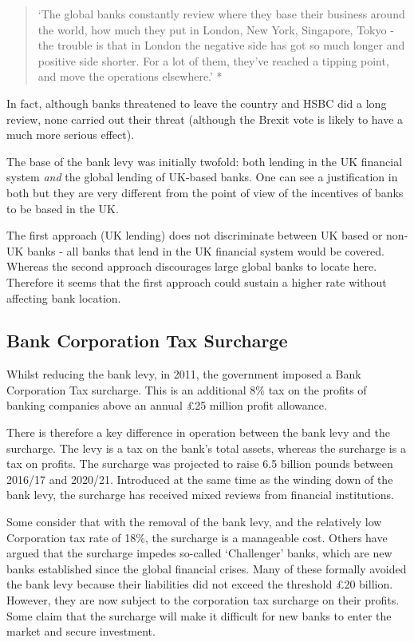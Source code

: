 \documentclass[]{tufte-handout}
\begin{document}
\begin{quote}
`The global banks constantly review where they base their business
around the world, how much they put in London, New York, Singapore,
Tokyo - the trouble is that in London the negative side has got so much
longer and positive side shorter. For a lot of them, they've reached a
tipping point, and move the operations elsewhere.' *
\end{quote}

In fact, although banks threatened to leave the country and HSBC did a
long review, none carried out their threat (although the Brexit vote is
likely to have a much more serious effect).

The base of the bank levy was initially twofold: both lending in the UK
financial system \emph{and} the global lending of UK-based banks. One
can see a justification in both but they are very different from the
point of view of the incentives of banks to be based in the UK.

The first approach (UK lending) does not discriminate between UK based
or non-UK banks - all banks that lend in the UK financial system would
be covered. Whereas the second approach discourages large global banks
to locate here. Therefore it seems that the first approach could sustain
a higher rate without affecting bank location.

\hypertarget{bank-corporation-tax-surcharge}{%
\subsection{Bank Corporation Tax
Surcharge}\label{bank-corporation-tax-surcharge}}

Whilst reducing the bank levy, in 2011, the government imposed a Bank
Corporation Tax surcharge. This is an additional 8\% tax on the profits
of banking companies above an annual £25 million profit allowance.

There is therefore a key difference in operation between the bank levy
and the surcharge. The levy is a tax on the bank's total assets, whereas
the surcharge is a tax on profits. The surcharge was projected to raise
6.5 billion pounds between 2016/17 and 2020/21. Introduced at the same
time as the winding down of the bank levy, the surcharge has received
mixed reviews from financial institutions.

Some consider that with the removal of the bank levy, and the relatively
low Corporation tax rate of 18\%, the surcharge is a manageable cost.
Others have argued that the surcharge impedes so-called `Challenger'
banks, which are new banks established since the global financial
crises. Many of these formally avoided the bank levy because their
liabilities did not exceed the threshold £20 billion. However, they are
now subject to the corporation tax surcharge on their profits. Some
claim that the surcharge will make it difficult for new banks to enter
the market and secure investment.
\end{document}
